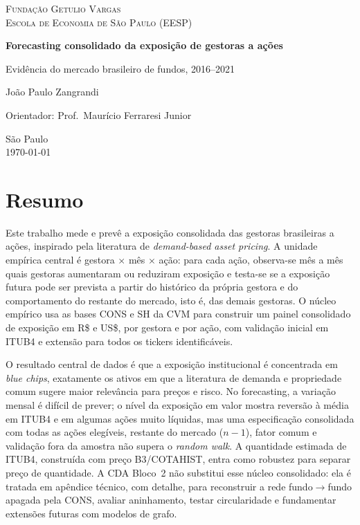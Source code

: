 \documentclass[12pt,a4paper]{report}
\begin{document}
\hypersetup{pageanchor=false}

\begin{titlepage}
\centering
\vspace*{1cm}
{\scshape\large Fundação Getulio Vargas \\ Escola de Economia de São Paulo (EESP)\par}
\vspace{2.5cm}
{\huge\bfseries Forecasting consolidado da exposição de gestoras a ações\par}
\vspace{0.8cm}
{\Large Evidência do mercado brasileiro de fundos, 2016--2021\par}
\vspace{3cm}
{\Large João Paulo Zangrandi\par}
\vspace{0.5cm}
{\large Orientador: Prof.\ Maurício Ferraresi Junior\par}
\vfill
{\large São Paulo \\ \today\par}
\end{titlepage}

\hypersetup{pageanchor=true}

\chapter*{Resumo}
Este trabalho mede e prevê a exposição consolidada das gestoras brasileiras a ações, inspirado pela literatura
de \emph{demand-based asset pricing}. A unidade empírica central é gestora $\times$ mês $\times$ ação:
para cada ação, observa-se mês a mês quais gestoras aumentaram ou reduziram exposição e testa-se se a
exposição futura pode ser prevista a partir do histórico da própria gestora e do comportamento do restante do
mercado, isto é, das demais gestoras. O núcleo empírico usa as bases CONS e SH da CVM para construir um
painel consolidado de exposição em R\$ e US\$, por gestora e por ação, com validação inicial em ITUB4 e
extensão para todos os tickers identificáveis.

O resultado central de dados é que a exposição institucional é concentrada em \emph{blue chips}, exatamente
os ativos em que a literatura de demanda e propriedade comum sugere maior relevância para preços e risco. No
forecasting, a variação mensal é difícil de prever; o nível da exposição em valor mostra reversão à média em
ITUB4 e em algumas ações muito líquidas, mas uma especificação consolidada com todas as ações elegíveis,
restante do mercado ($n-1$), fator comum e validação fora da amostra não supera o \emph{random walk}. A
quantidade estimada de ITUB4, construída com preço B3/COTAHIST, entra como robustez para separar preço de
quantidade. A CDA Bloco~2 não substitui esse núcleo consolidado: ela é tratada em apêndice técnico, com
detalhe, para reconstruir a rede fundo$\to$fundo apagada pela CONS, avaliar aninhamento, testar
circularidade e fundamentar extensões futuras com modelos de grafo.
\end{document}
